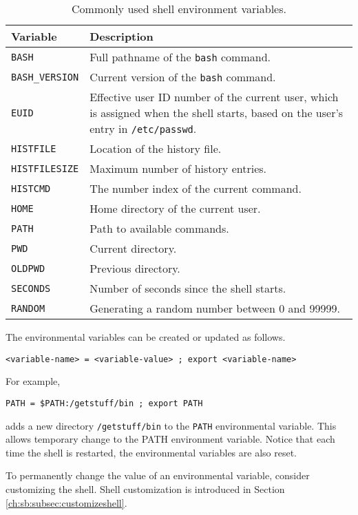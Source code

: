 {\begin{table}
	\centering \caption{Commonly used shell environment variables.}\label{ch:sb:tab:shellenvironmentvars}
	\begin{tabularx}{\textwidth}{lX}
		\hline
		Variable & Description \\ \hline
		\verb|BASH| & Full pathname of the \verb|bash| command. \\ 
		\verb|BASH_VERSION| & Current version of the \verb|bash| command. \\ 
		\verb|EUID| & Effective user ID number of the current user, which is assigned when the shell starts, based on the user's entry in \verb|/etc/passwd|. \\ 
		\verb|HISTFILE| & Location of the history file. \\ 
		\verb|HISTFILESIZE| & Maximum number of history entries. \\ 
		\verb|HISTCMD| & The number index of the current command. \\ 
		\verb|HOME| & Home directory of the current user. \\ 
		\verb|PATH| & Path to available commands. \\ 
		\verb|PWD| & Current directory. \\ 
		\verb|OLDPWD| & Previous directory. \\ 
		\verb|SECONDS| & Number of seconds since the shell starts. \\ 
		\verb|RANDOM| & Generating a random number between 0 and 99999. \\
		\hline
	\end{tabularx}
\end{table}

The environmental variables can be created or updated as follows.
\begin{lstlisting}
<variable-name> = <variable-value> ; export <variable-name>
\end{lstlisting}
For example,
\begin{lstlisting}
PATH = $PATH:/getstuff/bin ; export PATH
\end{lstlisting}
adds a new directory \verb|/getstuff/bin| to the \verb|PATH| environmental variable. This allows temporary change to the PATH environment variable. Notice that each time the shell is restarted, the environmental variables are also reset. 

To permanently change the value of an environmental variable, consider customizing the shell. Shell customization is introduced in Section \ref{ch:sb:subsec:customizeshell}.

}
